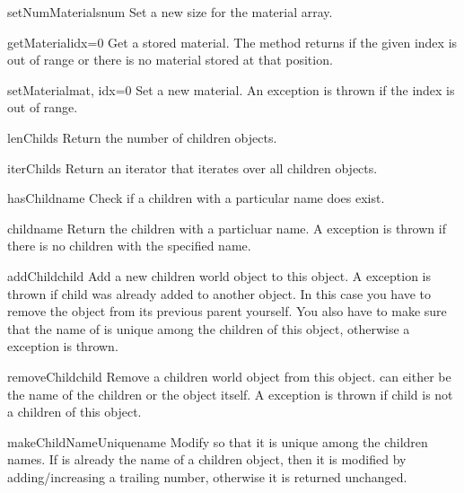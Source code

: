 \begin{methoddesc}{setNumMaterials}{num}
Set a new size for the material array.
\end{methoddesc}

\begin{methoddesc}{getMaterial}{idx=0}
Get a stored material. The method returns  if the given index
is out of range or there is no material stored at that position.
\end{methoddesc}

\begin{methoddesc}{setMaterial}{mat, idx=0}
Set a new material. An  exception is thrown if
the index is out of range.
\end{methoddesc}

\begin{methoddesc}{lenChilds}{}
Return the number of children objects.
\end{methoddesc}

\begin{methoddesc}{iterChilds}{}
Return an iterator that iterates over all children objects.
\end{methoddesc}

\begin{methoddesc}{hasChild}{name}
Check if a children with a particular name does exist.
\end{methoddesc}

\begin{methoddesc}{child}{name}
Return the children with a particluar name. A 
exception is thrown if there is no children with the specified name.
\end{methoddesc}

\begin{methoddesc}{addChild}{child}
Add a new children world object to this object. A
 exception is thrown if child was already added
to another object.  In this case you have to remove the object from
its previous parent yourself. You also have to make sure that the name
of  is unique among the children of this object, otherwise
a  exception is thrown.
\end{methoddesc}

\begin{methoddesc}{removeChild}{child}
Remove a children world object from this object.  can either
be the name of the children or the object itself. A 
exception is thrown if child is not a children of this object.
\end{methoddesc}

\begin{methoddesc}{makeChildNameUnique}{name}
Modify  so that it is unique among the children names. If
 is already the name of a children object, then it is modified
by adding/increasing a trailing number, otherwise it is returned
unchanged.
\end{methoddesc}




